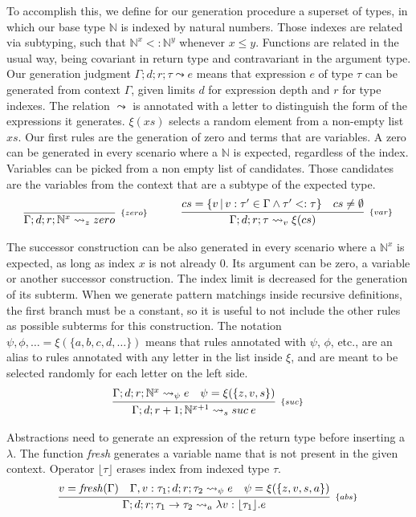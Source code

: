 \documentclass[runningheads]{llncs}
\newcommand{\tN}{\mathbb{N}}
\begin{document}
To accomplish this, we define for our generation procedure a 
superset of types, in which our base type $\tN$ is indexed by 
natural numbers. Those indexes are related via subtyping, 
such that $\tN^x <: \tN^y$ whenever $x \leq y$. Functions 
are related in the usual way, being covariant in return type 
and contravariant in the argument type. Our generation 
judgment $\Gamma; d; r; \tau \leadsto e$ means that 
expression $e$ of type $\tau$ can be generated from context 
$\Gamma$, given limits $d$ for expression depth and $r$ for 
type indexes. The relation $\leadsto$ is annotated with a 
letter to distinguish the form of the expressions it 
generates. $\xi(xs)$ selects a random element from a non-empty list $xs$. Our first rules are the generation of 
zero and terms that are variables. A zero can be generated in every 
scenario where a $\tN$ is expected, regardless of the index.
Variables can be picked from a non empty list of candidates. 
Those candidates are the variables from the context that are 
a subtype of the expected type.
\[\arraycolsep=1.5em
\begin{array}{c c}
\infer[_{\{zero\}}]{\Gamma; d; r; \tN^x \leadsto_z zero}{} & 
\infer[_{\{var\}}]{\Gamma; d; r; \tau \leadsto_v \xi(cs)}{cs = \{ v \, | \, v : \tau' \in \Gamma \land \tau' <: \tau\} & cs \neq \emptyset}
\end{array}
\]

\noindent The successor construction can be also generated in every 
scenario where a $\tN^x$ is expected, as long as index $x$ is 
not already 0. Its argument can be zero, a variable or 
another successor construction. The index limit is decreased 
for the generation of its subterm. When we generate pattern matchings 
inside recursive definitions, the first branch must be a constant, 
so it is useful to not include the other rules as possible subterms 
for this construction. The 
notation $\psi, \phi, \dots = \xi(\{a, b, c, d, \dots\})$ means 
that rules annotated with $\psi$, $\phi$, etc., are an 
alias to rules annotated with any letter in the list 
inside $\xi$, and are meant to be selected randomly for each 
letter on the left side.
\[
\begin{array}{c}
\infer[_{\{suc\}}]{\Gamma; d; r+1; \tN^{x+1} \leadsto_s suc \: e}{\Gamma; d; r; \tN^x \leadsto_{\psi} e & \psi = \xi(\{z, v, s\})}
\end{array}  
\]

\noindent Abstractions need to generate an expression of the return 
type before inserting a $\lambda$. The function \emph{fresh} 
generates a variable name that is not present in the given context.
Operator $\lfloor \tau \rfloor$ erases index from indexed 
type $\tau$.
\[
\begin{array}{c}
\infer[_{\{abs\}}]{\Gamma; d; r; \tau_1 \rightarrow \tau_2 \leadsto_a \lambda v : \lfloor \tau_1 \rfloor . e}{v = \mathit{fresh}(\Gamma) & \Gamma , v : \tau_1; d; r; \tau_2 \leadsto_{\psi} e & \psi = \xi(\{z, v, s, a\})}
\end{array}
\]
\end{document}
